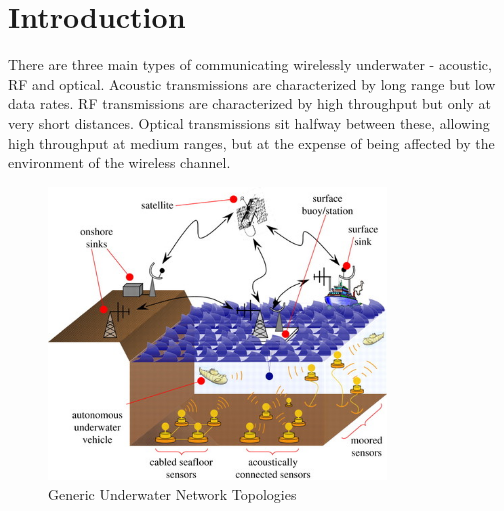 \section{Introduction}
There are three main types of communicating wirelessly underwater -
acoustic, RF and optical. Acoustic transmissions are characterized by
long range but low data rates. RF transmissions are characterized by
high throughput but only at very short distances. Optical transmissions
sit halfway between these, allowing high throughput at medium ranges,
but at the expense of being affected by the environment of the wireless
channel.

\begin{figure}[H]
  \includegraphics[width=0.8\textwidth]{underwater_network_topologies.jpg}
  \caption{Generic Underwater Network Topologies}
  \label{fig:underwater_network_topologies}
\end{figure}